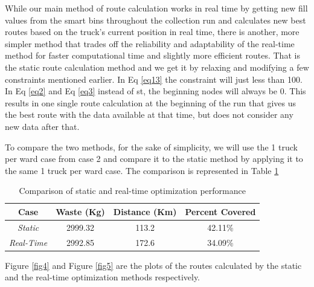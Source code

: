 \documentclass[12pt]{article}
\begin{document}
While our main method of route calculation works in real time by getting new fill values from the smart bins throughout the collection run and calculates new best routes based on the truck's current position in real time, there is another, more simpler method that trades off the reliability and adaptability of the real-time method for faster computational time and slightly more efficient routes. That is the static route calculation method and we get it by relaxing and modifying a few constraints mentioned earlier. In Eq \eqref{eq13} the constraint will just less than 100. In Eq \eqref{eq2} and Eq \eqref{eq3} instead of st, the beginning nodes will always be 0. This results in one single route calculation at the beginning of the run that gives us the best route with the data available at that time, but does not consider any new data after that.

To compare the two methods, for the sake of simplicity, we will use the 1 truck per ward case from case 2 and compare it to the static method by applying it to the same 1 truck per ward case. The comparison is represented in Table \ref{tab5}

\begin{table}[H]
    \centering
    \caption{Comparison of static and real-time optimization performance} \label{tab5}
    \vspace*{0.3cm}
    \begin{tabular}{|c|c|c|c|}
        \hline Case & Waste (Kg) & Distance (Km) & Percent Covered\\
        \hline \textit{Static}& 2999.32& 113.2 & 42.11\%\\
        \hline \textit{Real-Time}& 2992.85& 172.6& 34.09\%\\
        \hline
    \end{tabular}
\end{table}

Figure \ref{fig4} and Figure \ref{fig5} are the plots of the routes calculated by the static and the real-time optimization methods respectively.
\end{document}
